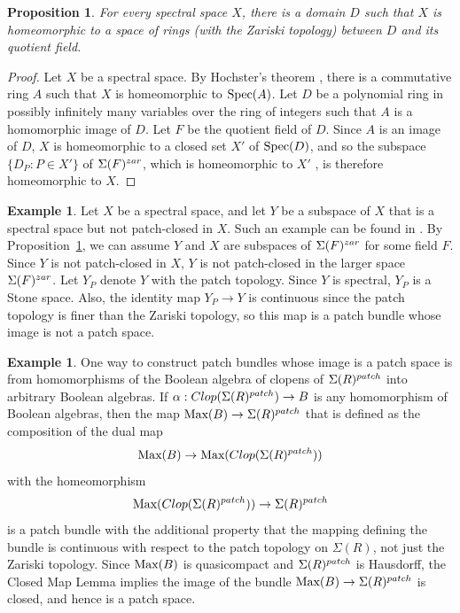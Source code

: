 \documentclass[11pt]{amsart}
\newtheorem{proposition}[theorem]{Proposition}
\theoremstyle{definition}
\newtheorem{example}[theorem]{Example}
\def\Spec{\mbox{\rm Spec}}
\def\Max{\mbox{\rm Max}}
\begin{document}
\begin{proposition} \label{not special} For every spectral space $X$, there is a domain $D$  such that $X$ is homeomorphic to a space of rings (with the Zariski topology) between $D$ and its quotient field.  
\end{proposition} 

\begin{proof} Let $X$ be a spectral space. By Hochster's theorem \cite{Hochster}, there is a commutative ring $A$ such that $X$ is homeomorphic to $\Spec(A)$.  Let $D$ be a polynomial ring in possibly infinitely many variables over the ring of integers such that  $A$ is a homomorphic image of $D$. Let $F$ be the quotient field of $D$.  Since $A$ is an image of $D$, $X$ is homeomorphic to a closed set $X'$ of $\Spec(D)$, and so the subspace $\{D_P:P \in X'\}$  of $\Sigma(F)^{\rm zar}$, which is homeomorphic to $X'$ \cite[Lemma~1, p.~116]{ZS},  is therefore homeomorphic to $X$. 
\end{proof}


\begin{example} Let $X$ be a spectral space, and let $Y$ be a subspace of $X$ that is a spectral space but not patch-closed in $X$. Such an example can be found in \cite[Example 2.1.2, p.~49]{ST}. By Proposition~\ref{not special}, we can assume $Y$ and $X$ are subspaces of $\Sigma(F)^{\rm zar}$ for some field $F$.  Since $Y$ is not patch-closed in $X$, $Y$ is not patch-closed in the larger space $\Sigma(F)^{\rm zar}$. Let $Y_P$ denote $Y$ with the patch topology. Since $Y$ is spectral, $Y_P$ is a Stone space. Also, the identity map $Y_P \rightarrow Y$ is continuous since the patch topology is finer than the Zariski topology, so this map is a patch bundle whose image is not a patch space. 
\end{example} 


\begin{example} One way to construct patch bundles whose image is a patch space is from homomorphisms of the Boolean algebra of clopens of $\Sigma(R)^{\rm patch}$ into arbitrary Boolean algebras.  
If $\alpha:{\rm Clop}({\Sigma}(R)^{\rm patch}) \rightarrow B$ is any homomorphism of Boolean algebras, then the map $\Max(B) \rightarrow {\Sigma}(R)^{\rm patch}$ that is defined as the composition of the 
dual map $$\Max(B) \rightarrow \Max({\rm Clop}({\Sigma}(R)^{\rm patch}))$$ with the homeomorphism $$\Max({\rm Clop}({\Sigma}(R)^{\rm patch})) \rightarrow {\Sigma}(R)^{\rm patch}$$ is a patch bundle with the additional property that the mapping defining the bundle is continuous with respect to the patch topology on $\Sigma(R)$, not just the Zariski topology. Since $\Max(B)$ is quasicompact and $\Sigma(R)^{\rm patch}$ is Hausdorff, the Closed Map Lemma implies the image of the bundle $\Max(B) \rightarrow \Sigma(R)^{\rm patch}$ is closed, and hence is a patch space.   
\end{example}
\end{document}

